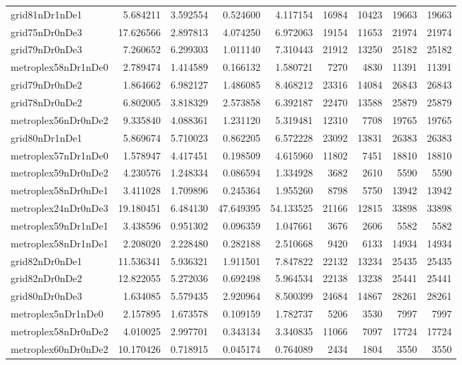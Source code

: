 \begin{longtable}{|l|r|r|r|r|r|r|r|r|}
grid81nDr1nDe1 & 5.684211 & 3.592554 & 0.524600 & 4.117154 & 16984 & 10423 & 19663 & 19663 \\
grid75nDr0nDe3 & 17.626566 & 2.897813 & 4.074250 & 6.972063 & 19154 & 11653 & 21974 & 21974 \\
grid79nDr0nDe3 & 7.260652 & 6.299303 & 1.011140 & 7.310443 & 21912 & 13250 & 25182 & 25182 \\
metroplex58nDr1nDe0 & 2.789474 & 1.414589 & 0.166132 & 1.580721 & 7270 & 4830 & 11391 & 11391 \\
grid79nDr0nDe2 & 1.864662 & 6.982127 & 1.486085 & 8.468212 & 23316 & 14084 & 26843 & 26843 \\
grid78nDr0nDe2 & 6.802005 & 3.818329 & 2.573858 & 6.392187 & 22470 & 13588 & 25879 & 25879 \\
metroplex56nDr0nDe2 & 9.335840 & 4.088361 & 1.231120 & 5.319481 & 12310 & 7708 & 19765 & 19765 \\
grid80nDr1nDe1 & 5.869674 & 5.710023 & 0.862205 & 6.572228 & 23092 & 13831 & 26383 & 26383 \\
metroplex57nDr1nDe0 & 1.578947 & 4.417451 & 0.198509 & 4.615960 & 11802 & 7451 & 18810 & 18810 \\
metroplex59nDr0nDe2 & 4.230576 & 1.248334 & 0.086594 & 1.334928 & 3682 & 2610 & 5590 & 5590 \\
metroplex58nDr0nDe1 & 3.411028 & 1.709896 & 0.245364 & 1.955260 & 8798 & 5750 & 13942 & 13942 \\
metroplex24nDr0nDe3 & 19.180451 & 6.484130 & 47.649395 & 54.133525 & 21166 & 12815 & 33898 & 33898 \\
metroplex59nDr1nDe1 & 3.438596 & 0.951302 & 0.096359 & 1.047661 & 3676 & 2606 & 5582 & 5582 \\
metroplex58nDr1nDe1 & 2.208020 & 2.228480 & 0.282188 & 2.510668 & 9420 & 6133 & 14934 & 14934 \\
grid82nDr0nDe1 & 11.536341 & 5.936321 & 1.911501 & 7.847822 & 22132 & 13234 & 25435 & 25435 \\
grid82nDr0nDe2 & 12.822055 & 5.272036 & 0.692498 & 5.964534 & 22138 & 13238 & 25441 & 25441 \\
grid80nDr0nDe3 & 1.634085 & 5.579435 & 2.920964 & 8.500399 & 24684 & 14867 & 28261 & 28261 \\
metroplex5nDr1nDe0 & 2.157895 & 1.673578 & 0.109159 & 1.782737 & 5206 & 3530 & 7997 & 7997 \\
metroplex58nDr0nDe2 & 4.010025 & 2.997701 & 0.343134 & 3.340835 & 11066 & 7097 & 17724 & 17724 \\
metroplex60nDr0nDe2 & 10.170426 & 0.718915 & 0.045174 & 0.764089 & 2434 & 1804 & 3550 & 3550 \\

\end{longtable}
